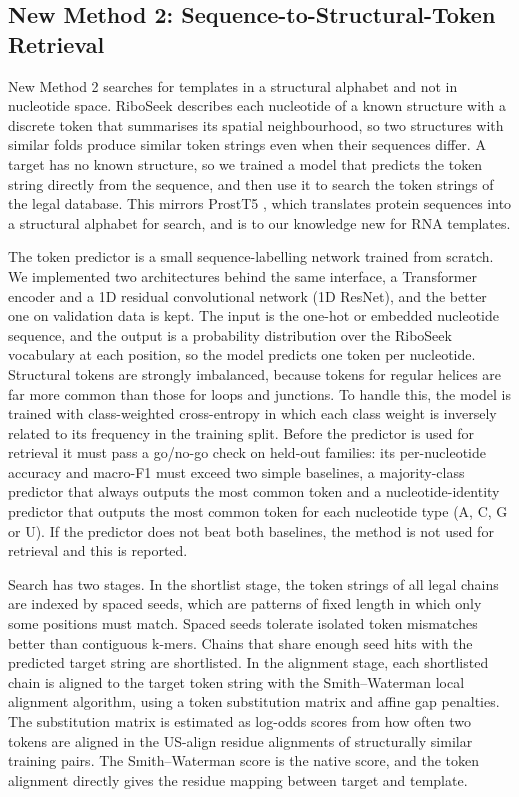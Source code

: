 \documentclass{FastFyp}
\begin{document}
\subsection{New Method 2: Sequence-to-Structural-Token Retrieval}
\label{sec:impl-nm2}
New Method 2 searches for templates in a structural alphabet and not in nucleotide space. RiboSeek \cite{wang2026riboseek} describes each nucleotide of a known structure with a discrete token that summarises its spatial neighbourhood, so two structures with similar folds produce similar token strings even when their sequences differ. A target has no known structure, so we trained a model that predicts the token string directly from the sequence, and then use it to search the token strings of the legal database. This mirrors ProstT5 \cite{heinzinger2024prostt5}, which translates protein sequences into a structural alphabet for search, and is to our knowledge new for RNA templates.

The token predictor is a small sequence-labelling network trained from scratch. We implemented two architectures behind the same interface, a Transformer encoder and a 1D residual convolutional network (1D ResNet), and the better one on validation data is kept. The input is the one-hot or embedded nucleotide sequence, and the output is a probability distribution over the RiboSeek vocabulary at each position, so the model predicts one token per nucleotide. Structural tokens are strongly imbalanced, because tokens for regular helices are far more common than those for loops and junctions. To handle this, the model is trained with class-weighted cross-entropy in which each class weight is inversely related to its frequency in the training split. Before the predictor is used for retrieval it must pass a go/no-go check on held-out families: its per-nucleotide accuracy and macro-F1 must exceed two simple baselines, a majority-class predictor that always outputs the most common token and a nucleotide-identity predictor that outputs the most common token for each nucleotide type (A, C, G or U). If the predictor does not beat both baselines, the method is not used for retrieval and this is reported.

Search has two stages. In the shortlist stage, the token strings of all legal chains are indexed by spaced seeds, which are patterns of fixed length in which only some positions must match. Spaced seeds tolerate isolated token mismatches better than contiguous k-mers. Chains that share enough seed hits with the predicted target string are shortlisted. In the alignment stage, each shortlisted chain is aligned to the target token string with the Smith--Waterman local alignment algorithm, using a token substitution matrix and affine gap penalties. The substitution matrix is estimated as log-odds scores from how often two tokens are aligned in the US-align residue alignments of structurally similar training pairs. The Smith--Waterman score is the native score, and the token alignment directly gives the residue mapping between target and template.
\end{document}
